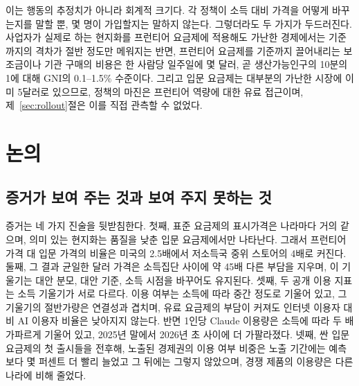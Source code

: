 \documentclass[11pt]{article}
\theoremstyle{definition}
\theoremstyle{remark}
\begin{document}
이는 행동의 추정치가 아니라 회계적 크기다. 각 정책이 소득 대비 가격을 어떻게 바꾸는지를 말할 뿐, 몇 명이 가입할지는 말하지 않는다. 그렇더라도 두 가지가 두드러진다. 사업자가 실제로 하는 현지화를 프런티어 요금제에 적용해도 가난한 경제에서는 기준까지의 격차가 절반 정도만 메워지는 반면, 프런티어 요금제를 기준까지 끌어내리는 보조금이나 기관 구매의 비용은 한 사람당 일주일에 몇 달러, 곧 생산가능인구의 10분의 1에 대해 GNI의 0.1--1.5\% 수준이다. 그리고 입문 요금제는 대부분의 가난한 시장에 이미 5달러로 있으므로, 정책의 마진은 프런티어 역량에 대한 유료 접근이며, 제~\ref{sec:rollout}절은 이를 직접 관측할 수 없었다.

\section{논의}\label{sec:discussion}

\subsection{증거가 보여 주는 것과 보여 주지 못하는 것}

증거는 네 가지 진술을 뒷받침한다. 첫째, 표준 요금제의 표시가격은 나라마다 거의 같으며, 의미 있는 현지화는 품질을 낮춘 입문 요금제에서만 나타난다. 그래서 프런티어 가격 대 입문 가격의 비율은 미국의 2.5배에서 저소득국 중위 스토어의 4배로 커진다. 둘째, 그 결과 균일한 달러 가격은 소득집단 사이에 약 45배 다른 부담을 지우며, 이 기울기는 대안 분모, 대안 기준, 소득 시점을 바꾸어도 유지된다. 셋째, 두 공개 이용 지표는 소득 기울기가 서로 다르다. 이용 여부는 소득에 따라 중간 정도로 기울어 있고, 그 기울기의 절반가량은 연결성과 겹치며, 유료 요금제의 부담이 커져도 인터넷 이용자 대비 AI 이용자 비율은 낮아지지 않는다. 반면 1인당 Claude 이용량은 소득에 따라 두 배 가파르게 기울어 있고, 2025년 말에서 2026년 초 사이에 더 가팔라졌다. 넷째, 싼 입문 요금제의 첫 출시들을 전후해, 노출된 경제권의 이용 여부 비중은 노출 기간에는 예측보다 몇 퍼센트 더 빨리 늘었고 그 뒤에는 그렇지 않았으며, 경쟁 제품의 이용량은 다른 나라에 비해 줄었다.
\end{document}
